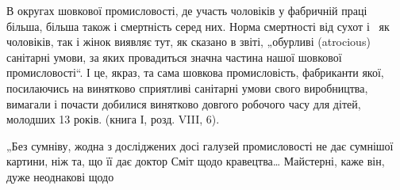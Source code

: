 \noindent{}В округах шовкової промисловості, де участь чоловіків
у фабричній праці більша, більша також і смертність серед них.
Норма смертності від сухот і~ як чоловіків, так і жінок
виявляє тут, як сказано в звіті, „обурливі (atrocious) санітарні
умови, за яких провадиться значна частина нашої шовкової
промисловості“. І це, якраз, та сама шовкова промисловість,
фабриканти якої, посилаючись на винятково сприятливі санітарні умови свого виробництва, вимагали і
почасти добилися
винятково довгого робочого часу для дітей, молодших 13 років.
(книга І, розд. VIII, 6).

„Без сумніву, жодна з досліджених досі галузей промисловості
не дає сумнішої картини, ніж та, що її дає доктор Сміт
щодо кравецтва\dots{} Майстерні, каже він, дуже неоднакові щодо
\parbreak{}  %
